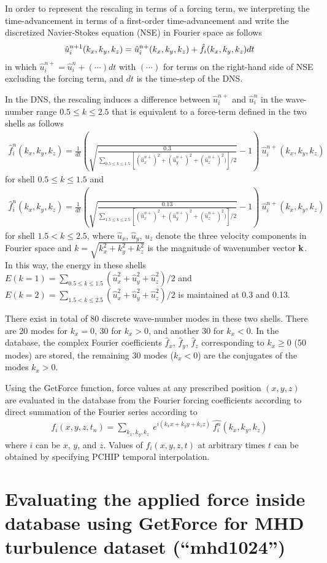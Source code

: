 \documentclass[11pt]{article}
\def\bea{\begin{eqnarray}}
\def\eea{\end{eqnarray}}
\begin{document}
In order to represent the rescaling in terms of a forcing term, we interpreting the time-advancement in terms of a
first-order time-advancement and write the discretized Navier-Stokes equation (NSE) in Fourier space as follows
\bea
\hat{u}_i^{n+1}(k_x,k_y,k_z) = \hat{u}_i^{n+}(k_x,k_y,k_z)+\hat{f}_i(k_x,k_y,k_z) dt
\label{eq:ui^{n+1}}
\eea
in which $\hat{u}_i^{n+}=\hat{u}_i^n+(\cdots)dt$ with $(\cdots)$ for terms on the right-hand side of NSE excluding the forcing term, and $dt$ is the time-step of the DNS.

In the DNS, the rescaling induces a difference between $\hat{u}_i^{n+}$ and $\hat{u}_i^{n}$ in the wave-number range $0.5\leq k\leq 2.5$  that is equivalent to a force-term
defined in the two shells as follows
\bea
 \hat {f}^n_i(k_x,k_y,k_z)=\frac{1}{dt} \left(\sqrt{\frac{0.3}{\sum_{0.5\leq k \leq 1.5}[(\hat {u}^{n+}_x)^2+(\hat {u}^{n+}_y)^2+(\hat {u}^{n+}_z)^2)]/2}}-1\right)~\hat {u}^{n+}_i(k_x,k_y,k_z)
\eea
for shell $0.5\leq k \leq 1.5$ and
\bea
 \hat {f}^n_i(k_x,k_y,k_z)=\frac{1}{dt} \left(\sqrt{\frac{0.13}{\sum_{1.5\leq k \leq 2.5}[(\hat {u}^{n+}_x)^2+(\hat {u}^{n+}_y)^2+(\hat {u}^{n+}_z)^2)]/2}}-1\right)~\hat {u}^{n+}_i(k_x,k_y,k_z)
\eea
for shell $1.5< k \leq 2.5$, where $\hat u_x$,  $\hat u_y$,  $\hat u_z$ denote the three velocity components in Fourier space and   $k=\sqrt{k_x^2+k_y^2+k_z^2}$ is the magnitude of wavenumber vector ${\bf  k}$. In this way, the energy in these shells $E(k=1)=\sum_{0.5\leq k \leq 1.5}(\hat {u}_x^2+\hat {u}_y^2+\hat {u}_z^2)/2$ and $E(k=2)=\sum_{1.5< k \leq 2.5}(\hat {u}_x^2+\hat {u}_y^2+\hat {u}_z^2)/2$ is maintained at 0.3 and 0.13.

There exist in total of 80 discrete wave-number modes in these two shells. There are 20 modes for $k_x=0$, 30 for $k_x>0$, and another 30 for $k_x<0$. In the database, the complex Fourier coefficients $\hat f_x$, $\hat f_y$, $\hat f_z$ corresponding to $k_x\geq 0$ (50 modes) are stored, the remaining 30 modes ($k_x<0$) are the conjugates of the modes $k_x>0$.

Using the GetForce function, force values at any prescribed position $(x,y,z)$ are evaluated in the database from the Fourier forcing coefficients according to direct summation of the Fourier series according to
\bea
f_i(x,y,z,t_n)= \sum_{k_x,k_y,k_z} ~e^{i(k_xx+k_yy+k_zz)}~\hat {f^n_i}(k_x,k_y,k_z)
\eea
where $i$ can be $x$, $y$, and $z$. Values of $f_i(x,y,z,t)$ at arbitrary times $t$ can be obtained by specifying PCHIP temporal interpolation.

\section{Evaluating the applied force inside database using GetForce for MHD turbulence dataset (``mhd1024'')}
\end{document}

